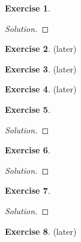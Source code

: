 \documentclass[12pt,a4]{article}
\theoremstyle{definition}
\newtheorem{exercise}{Exercise}
\begin{document}
\begin{exercise}
	
\end{exercise}
\begin{proof}[Solution]
	
\end{proof}

\begin{exercise}
	(later)
\end{exercise}

\begin{exercise}
	(later)
\end{exercise}

\begin{exercise}
	(later)
\end{exercise}

\begin{exercise}
	
\end{exercise}
\begin{proof}[Solution]
	
\end{proof}

\begin{exercise}
	
\end{exercise}
\begin{proof}[Solution]
	
\end{proof}

\begin{exercise}
	
\end{exercise}
\begin{proof}[Solution]
	
\end{proof}

\begin{exercise}
	(later) 
\end{exercise}
\end{document}
